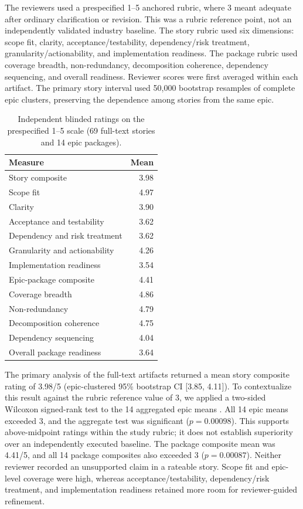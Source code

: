 \documentclass[pdflatex,sn-basic]{sn-jnl}
\begin{document}
The reviewers used a prespecified 1--5 anchored rubric, where 3 meant adequate after ordinary clarification or revision. This was a rubric reference point, not an independently validated industry baseline. The story rubric used six dimensions: scope fit, clarity, acceptance/testability, dependency/risk treatment, granularity/actionability, and implementation readiness. The package rubric used coverage breadth, non-redundancy, decomposition coherence, dependency sequencing, and overall readiness. Reviewer scores were first averaged within each artifact. The primary story interval used 50,000 bootstrap resamples of complete epic clusters, preserving the dependence among stories from the same epic.

\begin{table}[htbp]
\centering
\footnotesize
\caption{Independent blinded ratings on the prespecified 1--5 scale (69 full-text stories and 14 epic packages).}
\label{tab:blinded-artifact-review}
\begin{tabularx}{\columnwidth}{@{}Xr@{}}
\toprule
Measure & Mean \\
\midrule
Story composite & 3.98 \\
Scope fit & 4.97 \\
Clarity & 3.90 \\
Acceptance and testability & 3.62 \\
Dependency and risk treatment & 3.62 \\
Granularity and actionability & 4.26 \\
Implementation readiness & 3.54 \\
\midrule
Epic-package composite & 4.41 \\
Coverage breadth & 4.86 \\
Non-redundancy & 4.79 \\
Decomposition coherence & 4.75 \\
Dependency sequencing & 4.04 \\
Overall package readiness & 3.64 \\
\bottomrule
\end{tabularx}
\end{table}

The primary analysis of the full-text artifacts returned a mean story composite rating of 3.98/5 (epic-clustered 95\% bootstrap CI [3.85, 4.11]). To contextualize this result against the rubric reference value of 3, we applied a two-sided Wilcoxon signed-rank test to the 14 aggregated epic means \citep{R99}. All 14 epic means exceeded 3, and the aggregate test was significant (\(p=0.00098\)). This supports above-midpoint ratings within the study rubric; it does not establish superiority over an independently executed baseline. The package composite mean was 4.41/5, and all 14 package composites also exceeded 3 (\(p=0.00087\)). Neither reviewer recorded an unsupported claim in a rateable story. Scope fit and epic-level coverage were high, whereas acceptance/testability, dependency/risk treatment, and implementation readiness retained more room for reviewer-guided refinement.
\end{document}
